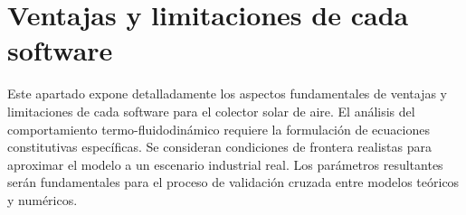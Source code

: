 \section{Ventajas y limitaciones de cada software}
\label{sec:cap08_ventajas_limitaciones}

Este apartado expone detalladamente los aspectos fundamentales de ventajas y limitaciones de cada software para el colector solar de aire.
El análisis del comportamiento termo-fluidodinámico requiere la formulación de ecuaciones constitutivas específicas.
Se consideran condiciones de frontera realistas para aproximar el modelo a un escenario industrial real.
Los parámetros resultantes serán fundamentales para el proceso de validación cruzada entre modelos teóricos y numéricos.
